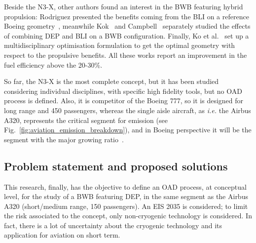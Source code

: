 Beside the N3-X, other authors found an interest in the BWB featuring hybrid propulsion: Rodriguez presented the benefits coming from the BLI on a reference Boeing geometry~\cite{bib:rodriguez}, meanwhile Kok~\cite{bib:kok} and Campbell~\cite{bib:campbell_bli} separately studied the effects of combining DEP and BLI on a BWB configuration.
Finally, Ko et al.~\cite{bib:ko_bwb} set up a multidisciplinary optimisation formulation to get the optimal geometry with respect to the propulsive benefits. 
All these works report an improvement in the fuel efficiency above the 20-30\%.

So far, the N3-X is the most complete concept, but it has been studied considering individual disciplines, with specific high fidelity tools, but no OAD process is defined. 
Also, it is competitor of the Boeing 777, so it is designed for long range and 450 passengers, whereas the single aisle aircraft, as \textit{i.e.} the Airbus A320, represents the critical segment for emission (see Fig.~\ref{fig:aviation_emission_breakdown}), and in Boeing perspective it will be the segment with the major growing ratio~\cite{bib:boeing_outlook_market}. 

\subsection{Problem statement and proposed solutions}
\label{subsec:chap1_prob_statement}

This research, finally, has the objective to define an OAD process, at conceptual level, for the study of a BWB featuring DEP, in the same segment as the Airbus A320 (short/medium range, 150 passengers). 
An EIS 2035 is considered; to limit the risk associated to the concept, only non-cryogenic technology is considered. 
In fact, there is a lot of uncertainty about the cryogenic technology and its application for aviation on short term. 

